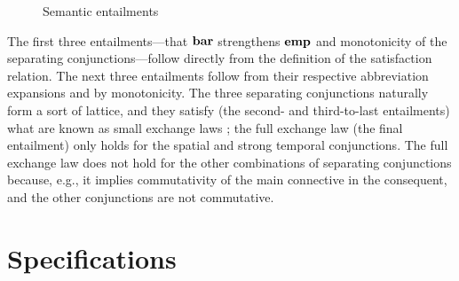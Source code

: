\documentclass[11pt]{report}
\begin{document}
\begin{figure}[ht]
    \centering
    \caption{\label{fig:sequential-entailments}Semantic entailments}
\end{figure}

The first three entailments---that $\mathbf{bar}$ strengthens $\mathbf{emp}$ and monotonicity of the separating conjunctions---follow directly from the definition of the satisfaction relation. The next three entailments follow from their respective abbreviation expansions and by monotonicity. The three separating conjunctions naturally form a sort of lattice, and they satisfy (the second- and third-to-last entailments) what are known as small exchange laws \cite{DBLP:conf/concur/HoareHMOPS11}; the full exchange law (the final entailment) only holds for the spatial and strong temporal conjunctions. The full exchange law does not hold for the other combinations of separating conjunctions because, e.g., it implies commutativity of the main connective in the consequent, and the other conjunctions are not commutative. 


\section{Specifications}
\label{sec:sequential-specifications}
\end{document}
